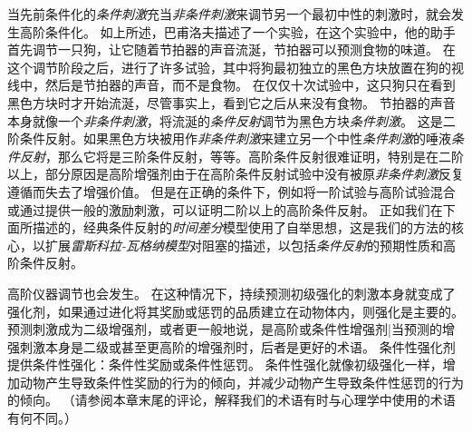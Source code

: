 当先前条件化的\textit{条件刺激}充当\textit{非条件刺激}来调节另一个最初中性的刺激时，就会发生高阶条件化。
如上所述，巴甫洛夫描述了一个实验，在这个实验中，他的助手首先调节一只狗，让它随着节拍器的声音流涎，节拍器可以预测食物的味道。
在这个调节阶段之后，进行了许多试验，其中将狗最初独立的黑色方块放置在狗的视线中，然后是节拍器的声音，而不是食物。
在仅仅十次试验中，这只狗只在看到黑色方块时才开始流涎，尽管事实上，看到它之后从来没有食物。
节拍器的声音本身就像一个\textit{非条件刺激}，将流涎的\textit{条件反射}调节为黑色方块\textit{条件刺激}。
这是二阶条件反射。如果黑色方块被用作\textit{非条件刺激}来建立另一个中性\textit{条件刺激}的唾液\textit{条件反射}，那么它将是三阶条件反射，等等。高阶条件反射很难证明，特别是在二阶以上，部分原因是高阶增强剂由于在高阶条件反射试验中没有被原\textit{非条件刺激}反复遵循而失去了增强价值。
但是在正确的条件下，例如将一阶试验与高阶试验混合或通过提供一般的激励刺激，可以证明二阶以上的高阶条件反射。
正如我们在下面所描述的，经典条件反射的\textit{时间差分}模型使用了自举思想，这是我们的方法的核心，以扩展\textit{雷斯科拉-瓦格纳模型}对阻塞的描述，以包括\textit{条件反射}的预期性质和高阶条件反射。
	
	
高阶仪器调节也会发生。
在这种情况下，持续预测初级强化的刺激本身就变成了强化剂，如果通过进化将其奖励或惩罚的品质建立在动物体内，则强化是主要的。
预测刺激成为二级增强剂，或者更一般地说，是高阶或条件性增强剂|当预测的增强刺激本身是二级或甚至更高阶的增强剂时，后者是更好的术语。
条件性强化剂提供条件性强化：条件性奖励或条件性惩罚。
条件性强化就像初级强化一样，增加动物产生导致条件性奖励的行为的倾向，并减少动物产生导致条件性惩罚的行为的倾向。
（请参阅本章末尾的评论，解释我们的术语有时与心理学中使用的术语有何不同。）



